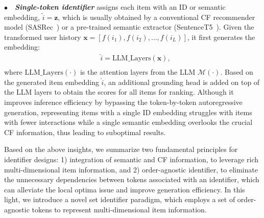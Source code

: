 \vspace{2pt}
\noindent$\bullet\quad$\textbf{\textit{Single-token identifier}} assigns each item with an ID or semantic embedding, \ie $\tilde{i}=\bm{z}$, 
which is usually obtained by a conventional CF recommender model (\eg SASRec~\cite{kang2018self})
or a pre-trained semantic extractor (\eg SentenceT5~\cite{ni2021sentence}). 
Given the transformed user history $\bm{x}= [f(i_{1}), f(i_{2}), \dots, f(i_{L})]$, it first generates the embedding:
\begin{equation}
\begin{aligned}
&\hat{i} = \text{LLM\_Layers}(\bm{x}), \\
\end{aligned}
\end{equation}
where $\text{LLM\_Layers}(\cdot)$ is the attention layers from the LLM $\mathcal{M}(\cdot)$. 
Based on the generated item embedding $\hat{i}$, 
an additional grounding head is added on top of the LLM layers to obtain the scores for all items for ranking. 
Although it improves inference efficiency by bypassing the token-by-token autoregressive generation, 
representing items with a single ID embedding struggles with items with fewer interactions while a single semantic embedding overlooks the crucial CF information, thus leading to suboptimal results. 

Based on the above insights, we
summarize two fundamental principles for identifier designs: 
1) integration of semantic and CF information, to leverage rich multi-dimensional item information, and  
2) order-agnostic identifier, to eliminate the unnecessary dependencies between tokens associated with an identifier, which can alleviate the local optima issue and improve generation efficiency.  
In this light, we introduce a novel set identifier paradigm, which employs a set of order-agnostic tokens to represent multi-dimensional item information. 

